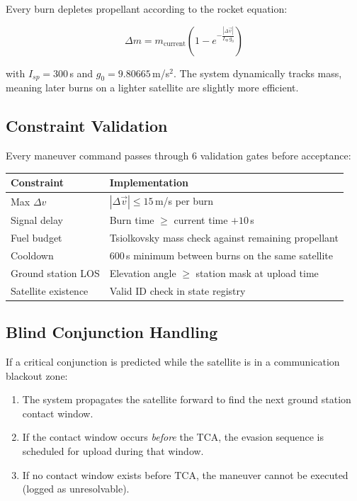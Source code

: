 \documentclass[11pt, a4paper]{article}
\begin{document}
Every burn depletes propellant according to the rocket equation:

\begin{equation}
  \Delta m = m_\text{current}\left(1 - e^{-\frac{|\Delta\vec{v}|}{I_{sp}\,g_0}}\right)
\end{equation}

with $I_{sp} = 300$\,s and $g_0 = 9.80665$\,m/s$^2$. The system dynamically tracks mass, meaning later burns on a lighter satellite are slightly more efficient.

\subsection{Constraint Validation}

Every maneuver command passes through 6 validation gates before acceptance:

\begin{table}[H]
\centering
\begin{tabularx}{\textwidth}{l X}
\toprule
\textbf{Constraint} & \textbf{Implementation} \\
\midrule
Max $\Delta v$ & $|\Delta\vec{v}| \leq 15$\,m/s per burn \\
Signal delay & Burn time $\geq$ current time $+ 10$\,s \\
Fuel budget & Tsiolkovsky mass check against remaining propellant \\
Cooldown & 600\,s minimum between burns on the same satellite \\
Ground station LOS & Elevation angle $\geq$ station mask at upload time \\
Satellite existence & Valid ID check in state registry \\
\bottomrule
\end{tabularx}
\end{table}

\subsection{Blind Conjunction Handling}

If a critical conjunction is predicted while the satellite is in a communication blackout zone:
\begin{enumerate}[nosep]
  \item The system propagates the satellite forward to find the next ground station contact window.
  \item If the contact window occurs \emph{before} the TCA, the evasion sequence is scheduled for upload during that window.
  \item If no contact window exists before TCA, the maneuver cannot be executed (logged as unresolvable).
\end{enumerate}
\end{document}
